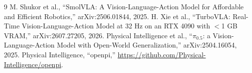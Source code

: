 \documentclass[10pt,a4paper]{article}
\begin{document}
\renewcommand{\refname}{参考文献}
{\footnotesize
\begin{thebibliography}{9}
\setlength{\itemsep}{0pt}
 M. Shukor et al., ``SmolVLA: A Vision-Language-Action Model for Affordable and Efficient Robotics,'' arXiv:2506.01844, 2025.
 H. Xie et al., ``TurboVLA: Real-Time Vision-Language-Action Model at 32 Hz on an RTX 4090 with $<$1 GB VRAM,'' arXiv:2607.27205, 2026.
 Physical Intelligence et al., ``$\pi_{0.5}$: a Vision-Language-Action Model with Open-World Generalization,'' arXiv:2504.16054, 2025.
 Physical Intelligence, ``openpi,'' \url{https://github.com/Physical-Intelligence/openpi}.
\end{thebibliography}
}
\end{document}
